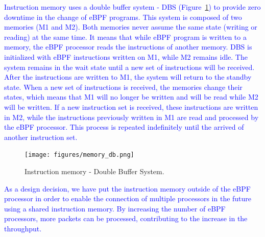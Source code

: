 \textcolor{blue}{Instruction memory uses a double buffer system - DBS (Figure~\ref{fig:mem_db}) to provide zero downtime in the change of eBPF programs. This system is composed of two memories (M1 and M2). Both memories never assume the same state (writing or reading) at the same time. It means that while eBPF program is written to a memory, the eBPF processor reads the instructions of another memory. DBS is initialized with eBPF instructions written on M1, while M2 remains idle. The system remains in the wait state until a new set of instructions will be received. After the instructions are written to M1, the system will return to the standby state. When a new set of instructions is received, the memories change their states, which means that M1 will no longer be written and will be read while M2 will be written. If a new instruction set is received, these instructions are written in M2, while the instructions previously written in M1 are read and processed by the eBPF processor. This process is repeated indefinitely until the arrived of another instruction set.} 

\begin{figure}[ht]
\centering
\texttt{[image: figures/memory\_db.png]}
\caption{Instruction memory - Double Buffer System.}
\label{fig:mem_db}
\end{figure}

\textcolor{blue}{As a design decision, we have put the instruction memory outside of the eBPF processor in order to enable the connection of multiple processors in the future using a shared instruction memory. By increasing the number of eBPF processors, more packets can be processed, contributing to the increase in the throughput.}



